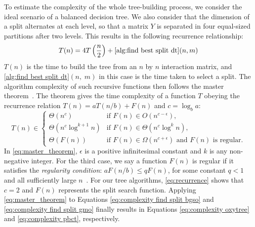 \documentclass[sn-mathphys-num]{sn-jnl}%
\theoremstyle{thmstyleone}%
\theoremstyle{thmstyletwo}%
\theoremstyle{thmstylethree}%
\begin{document}
\begin{appendices}
To estimate the complexity of the whole tree-building process, we consider the ideal scenario of a balanced decision tree.
We also consider that the dimension of a split alternates at each level, so that a matrix $Y$ is separated in four equal-sized partitions after two levels. This results in the following recurrence relationship:
%
\begin{equation}
    T(n) = 4T\left(\frac{n}{2}\right) + \text{\ref{alg:find best split dt}}(n, m)
    \label{eq:recurrence}
\end{equation}
%
$T(n)$ is the time to build the tree from an $n$ by $n$ interaction matrix, and \ref{alg:find best split dt}$(n,\; m)$ in this case is the time taken to select a split.
The algorithm complexity of such recursive functions then follows the master theorem~\cite{cormen_introduction_2022}. The theorem gives the time complexity of a function $T$ obeying the recurrence relation $T(n) = aT(n/b) + F(n)$ and $c=\log_b a$:
%
\begin{equation}
    T(n) \in \begin{cases}
        \Theta(n^c) & \text{if } F(n) \in O(n^{c-\epsilon})\text{,} \\
        \Theta(n^c \log^{k+1} n) & \text{if } F(n) \in \Theta(n^c \log^k n)\text{,}\\
        \Theta(F(n)) & \text{if } F(n) \in \Omega(n^{c+\epsilon})
            \text{ and }F(n)\text{ is regular.}
    \end{cases}
    \label{eq:master_theorem}
\end{equation}
%
In \autoref{eq:master_theorem}, $\epsilon$ is a positive infinitesimal constant and $k$ is any non-negative integer. For the third case, we say a function $F(n)$ is regular if it satisfies the \emph{regularity condition}: $aF(n/b) \leq qF(n)$, for some constant $q < 1$ and all sufficiently large $n$~\cite{cormen_introduction_2022}.
% 
For our tree algorithms, \autoref{eq:recurrence} shows that $c=2$ and $F(n)$ represents the split search function.
Applying \autoref{eq:master_theorem} to Equations \ref{eq:complexity find split bgso} and \ref{eq:complexity find split gmo} finally results in Equations \ref{eq:complexity oxytree} and \ref{eq:complexity pbct}, respectively.


\end{appendices}
\end{document}
